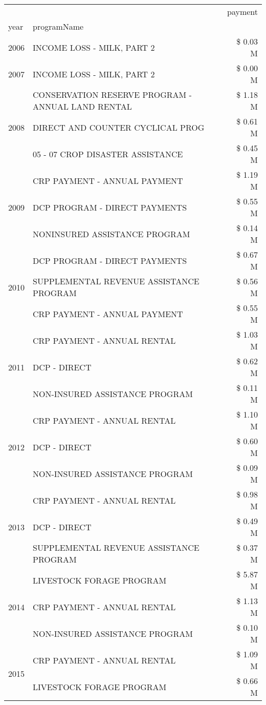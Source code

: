 \begin{tabular}{llr}
\toprule
 &  & payment \\
year & programName &  \\
\midrule
2006 & INCOME LOSS - MILK, PART 2 & \$ 0.03 M \\
\cline{1-3}
2007 & INCOME LOSS - MILK, PART 2 & \$ 0.00 M \\
\cline{1-3}
\multirow[t]{3}{*}{2008} & CONSERVATION RESERVE PROGRAM - ANNUAL LAND RENTAL & \$ 1.18 M \\
 & DIRECT AND COUNTER CYCLICAL PROG & \$ 0.61 M \\
 & 05 - 07 CROP DISASTER ASSISTANCE & \$ 0.45 M \\
\cline{1-3}
\multirow[t]{3}{*}{2009} & CRP PAYMENT - ANNUAL PAYMENT & \$ 1.19 M \\
 & DCP PROGRAM - DIRECT PAYMENTS & \$ 0.55 M \\
 & NONINSURED ASSISTANCE PROGRAM & \$ 0.14 M \\
\cline{1-3}
\multirow[t]{3}{*}{2010} & DCP PROGRAM - DIRECT PAYMENTS & \$ 0.67 M \\
 & SUPPLEMENTAL REVENUE ASSISTANCE PROGRAM & \$ 0.56 M \\
 & CRP PAYMENT - ANNUAL PAYMENT & \$ 0.55 M \\
\cline{1-3}
\multirow[t]{3}{*}{2011} & CRP PAYMENT - ANNUAL RENTAL & \$ 1.03 M \\
 & DCP - DIRECT & \$ 0.62 M \\
 & NON-INSURED ASSISTANCE PROGRAM & \$ 0.11 M \\
\cline{1-3}
\multirow[t]{3}{*}{2012} & CRP PAYMENT - ANNUAL RENTAL & \$ 1.10 M \\
 & DCP - DIRECT & \$ 0.60 M \\
 & NON-INSURED ASSISTANCE PROGRAM & \$ 0.09 M \\
\cline{1-3}
\multirow[t]{3}{*}{2013} & CRP PAYMENT - ANNUAL RENTAL & \$ 0.98 M \\
 & DCP - DIRECT & \$ 0.49 M \\
 & SUPPLEMENTAL REVENUE ASSISTANCE PROGRAM & \$ 0.37 M \\
\cline{1-3}
\multirow[t]{3}{*}{2014} & LIVESTOCK FORAGE PROGRAM & \$ 5.87 M \\
 & CRP PAYMENT - ANNUAL RENTAL & \$ 1.13 M \\
 & NON-INSURED ASSISTANCE PROGRAM & \$ 0.10 M \\
\cline{1-3}
\multirow[t]{3}{*}{2015} & CRP PAYMENT - ANNUAL RENTAL & \$ 1.09 M \\
 & LIVESTOCK FORAGE PROGRAM & \$ 0.66 M \\

\end{tabular}
